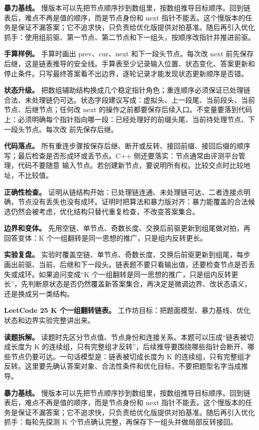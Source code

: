 \textbf{暴力基线。} 慢版本可以先把节点顺序抄到数组里，按数组推导目标顺序。回到链表后，难点不再是值的顺序，而是节点身份和 next 指针不能丢。这个慢版本的任务是保证不漏答案；它不追求快，只负责给优化版提供对拍基准。随后再引入优化抓手：使用组前驱、第一节点、第二节点和下一组头，按顺序改指针并推进前驱。

\textbf{手算样例。} 手算时画出 prev、cur、next 和下一段头节点。每次改 next 前先保存后继，这是链表推导的安全线。手算表至少记录输入位置、状态变化、答案更新和停止条件。只写最终答案看不出边界，逐轮记录才能发现状态更新顺序是否错。

\textbf{状态升级。} 把数组辅助结构换成几个稳定指针角色；重连顺序必须保证已处理链合法、未处理链仍可达。状态字段建议写成：虚拟头、上一段尾、当前段头、当前节点、后继节点；任何改 next 的操作之前都要保存后续入口。不变量要落到代码上：必须明确每个指针指向哪一段：已经处理好的前缀头尾、当前待处理节点、下一段头节点。每次改  前先保存后继。

\textbf{代码落点。} 所有重连步骤按保存后继、断开或反转、接回前缀、接回后缀的顺序写；最后检查是否形成环或丢节点。C++ 侧还要落实：节点通常由评测平台管理，代码不要随意  输入节点。若创建新节点，要说明所有权。比较交点时比较地址，不比较值。

\textbf{正确性检查。} 证明从链结构开始：已处理链连通、未处理链可达、二者连接点明确，节点没有丢失也没有成环。证明时把算法和暴力版对齐：暴力能覆盖的合法候选仍然会被考虑，优化结构只替代重复检查，不改变答案集合。

\textbf{边界和变体。} 先用空链、单节点、奇数长度、交换后前驱更新到组尾做对拍，再回答变体：K 个一组翻转是同一思想的推广，只是组内反转更长。

\textbf{实验复盘。} 实验时覆盖空链、单节点、奇数长度、交换后前驱更新到组尾，每步画出前驱、当前、后继和下一段头。链表题不要只看输出值，还要检查节点是否丢失或成环。如果追问变成“K 个一组翻转是同一思想的推广，只是组内反转更长”，先判断原状态是否仍然覆盖新答案集合，再决定是微调边界、改状态语义，还是换成另一类结构。

\noindent\textbf{LeetCode 25 K 个一组翻转链表。} 工作坊目标：把题面模型、暴力基线、优化状态和边界实验完整讲出来。

\textbf{读题拆解。} 读题时先区分节点值、节点身份和连接关系。本题可以压成“链表被切成长度为 K 的连续组，只有完整组才反转”，后续推导要围绕哪些指针会断开、哪些节点仍要可达。一句话模型是：链表被切成长度为 K 的连续组，只有完整组才反转。这里要先确认答案对象、合法性条件和优化目标，不要把题型名字当成推导。

\textbf{暴力基线。} 慢版本可以先把节点顺序抄到数组里，按数组推导目标顺序。回到链表后，难点不再是值的顺序，而是节点身份和 next 指针不能丢。这个慢版本的任务是保证不漏答案；它不追求快，只负责给优化版提供对拍基准。随后再引入优化抓手：每轮先探测 K 个节点确认完整，再保存下一组头并做局部反转接回。

